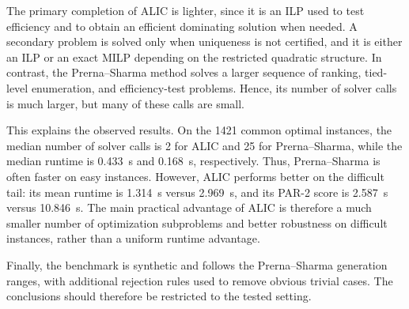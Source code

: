 The primary completion of ALIC is lighter, since it is an ILP used to
test efficiency and to obtain an efficient dominating solution when
needed. A secondary problem is solved only when uniqueness is not
certified, and it is either an ILP or an exact MILP depending on the
restricted quadratic structure. In contrast, the Prerna--Sharma method
solves a larger sequence of ranking, tied-level enumeration, and
efficiency-test problems. Hence, its number of solver calls is much
larger, but many of these calls are small.

This explains the observed results. On the 1421 common optimal instances,
the median number of solver calls is 2 for ALIC and 25 for
Prerna--Sharma, while the median runtime is 0.433~s and 0.168~s,
respectively. Thus, Prerna--Sharma is often faster on easy instances.
However, ALIC performs better on the difficult tail: its mean runtime is
1.314~s versus 2.969~s, and its PAR-2 score is 2.587~s versus 10.846~s.
The main practical advantage of ALIC is therefore a much smaller number of
optimization subproblems and better robustness on difficult instances,
rather than a uniform runtime advantage.

Finally, the benchmark is synthetic and follows the Prerna--Sharma
generation ranges, with additional rejection rules used to remove obvious
trivial cases. The conclusions should therefore be restricted to the
tested setting.
